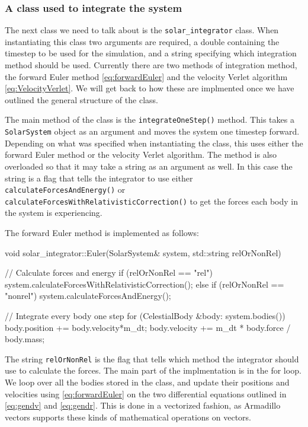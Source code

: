 \documentclass[reprint,english,notitlepage]{revtex4-1}  %
\begin{document}
\subsubsection{A class used to integrate the system} \label{sec:III:a:3}

The next class we need to talk about is the \verb+solar_integrator+ class. When instantiating this class two arguments are required, a double containing the timestep to be used for the simulation, and a string specifying which integration method should be used. Currently there are two methods of integration method, the forward Euler method \eqref{eq:forwardEuler} and the velocity Verlet algorithm \eqref{eq:VelocityVerlet}. We will get back to how these are implmented once we have outlined the general structure of the class.

The main method of the class is the \verb+integrateOneStep()+ method. This takes a \verb+SolarSystem+ object as an argument and moves the system one timestep forward. Depending on what was specified when instantiating the class, this uses either the forward Euler method or the velocity Verlet algorithm. The method is also overloaded so that it may take a string as an argument as well. In this case the string is a flag that tells the integrator to use either \verb+calculateForcesAndEnergy()+ or \verb+calculateForcesWithRelativisticCorrection()+ to get the forces each body in the system is experiencing.

The forward Euler method is implemented as follows:
\begin{cpp}
void solar_integrator::Euler(SolarSystem& system,
							 std::string relOrNonRel) {
  // Calculate forces and energy
  if (relOrNonRel == "rel") {
    system.calculateForcesWithRelativisticCorrection();
  } else if (relOrNonRel == "nonrel") {
    system.calculateForcesAndEnergy();
  }

  // Integrate every body one step
  for (CelestialBody &body: system.bodies()) {
    body.position += body.velocity*m_dt;
    body.velocity += m_dt * body.force / body.mass;
  }
}
\end{cpp}

The string \verb+relOrNonRel+ is the flag that tells which method the integrator should use to calculate the forces.    The main part of the implmentation is in the for loop. We loop over all the bodies stored in the class, and update their positions and velocities using \eqref{eq:forwardEuler} on the two differential equations outlined in \eqref{eq:gendv} and \eqref{eq:gendr}. This is done in a vectorized fashion, as Armadillo \citep{Armadillo} vectors supports these kinds of mathematical operations on vectors.
\end{document}
